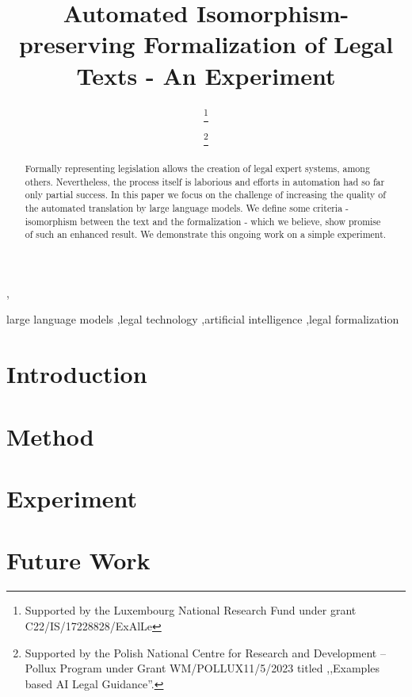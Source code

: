 \documentclass{IOS-Book-Article}
\begin{document}
\pagestyle{headings}
\def\thepage{}
\begin{frontmatter}              %


\title{Automated Isomorphism-preserving Formalization of Legal Texts - An Experiment}


\author[A]{ %
\thanks{Supported by the Luxembourg National Research Fund under grant C22/IS/17228828/ExAlLe}},
\author[B]{ 
\thanks{Supported by the Polish National Centre for Research
and Development – Pollux Program under Grant WM/POLLUX11/5/2023
titled ,,Examples based AI Legal Guidance''.}}
\address[A]{Luxembourg University, Luxembourg}
\address[B]{AGH University of Krakow, Poland}

\begin{abstract}
    Formally representing legislation allows the creation of legal expert systems, among others. Nevertheless, the process itself is laborious
    and efforts in automation had so far only partial success. 
    In this paper we focus on the challenge of increasing the quality of the automated translation by large language models. We define some criteria - isomorphism between the text and the formalization - which we believe,
    show promise of such an enhanced result. We demonstrate this ongoing work on a simple experiment.
\end{abstract}

\begin{keyword}
large language models \sep legal technology \sep artificial intelligence \sep legal formalization
\end{keyword}
\end{frontmatter}

\section{Introduction}
\label{sec:intro}


\section{Method}
\label{sec:formalization}


\section{Experiment}
\label{sec:experiment}


\section{Future Work}
\label{sec:conc}




\end{document}
